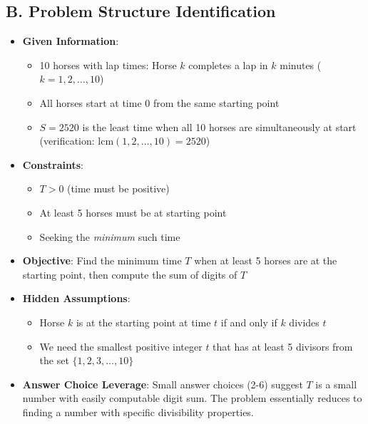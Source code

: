 \documentclass[]{article}
\begin{document}
\begin{problemconfigbox}
\subsection*{B. Problem Structure Identification}
\begin{itemize}[leftmargin=*]
    \item \textbf{Given Information}: 
    \begin{itemize}
        \item 10 horses with lap times: Horse $k$ completes a lap in $k$ minutes ($k = 1, 2, \ldots, 10$)
        \item All horses start at time 0 from the same starting point
        \item $S = 2520$ is the least time when all 10 horses are simultaneously at start (verification: $\text{lcm}(1,2,\ldots,10) = 2520$)
    \end{itemize}
    \item \textbf{Constraints}: 
    \begin{itemize}
        \item $T > 0$ (time must be positive)
        \item At least 5 horses must be at starting point
        \item Seeking the \textit{minimum} such time
    \end{itemize}
    \item \textbf{Objective}: Find the minimum time $T$ when at least 5 horses are at the starting point, then compute the sum of digits of $T$
    \item \textbf{Hidden Assumptions}: 
    \begin{itemize}
        \item Horse $k$ is at the starting point at time $t$ if and only if $k$ divides $t$
        \item We need the smallest positive integer $t$ that has at least 5 divisors from the set $\{1, 2, 3, \ldots, 10\}$
    \end{itemize}
    \item \textbf{Answer Choice Leverage}: Small answer choices (2-6) suggest $T$ is a small number with easily computable digit sum. The problem essentially reduces to finding a number with specific divisibility properties.
\end{itemize}


\end{problemconfigbox}
\end{document}

